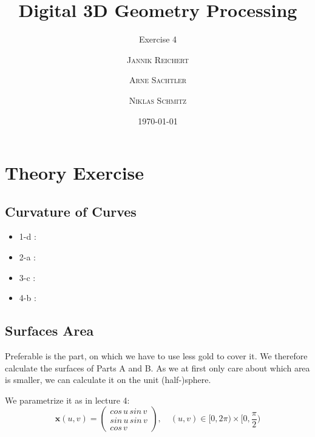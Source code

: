 \documentclass{scrartcl}
\title{Digital 3D Geometry Processing}
\subtitle{Exercise 4}
\author{\textsc{Jannik Reichert} \and \textsc{Arne Sachtler} \and \textsc{Niklas Schmitz}}
\date{\today}
\begin{document}
\maketitle

\section{Theory Exercise}

\subsection{Curvature of Curves}

\begin{itemize}
	\item 1-d : 
	\item 2-a : 
	\item 3-c : 
	\item 4-b : 
\end{itemize}

\subsection{Surfaces Area}

Preferable is the part, on which we have to use less gold to cover it.
We therefore calculate the surfaces of Parts A and B.
As we at first only care about which area is smaller, we can calculate it on the 
unit (half-)sphere.

We parametrize it as in lecture 4:
\begin{equation}
	\mathbf{x}(u,v) = 
	\begin{pmatrix}
		cos\,u\,sin\,v\\
		sin\,u\,sin\,v\\
		cos\,v
	\end{pmatrix}
	,\quad
	(u,v)\in[0,2\pi)\times [0,\frac{\pi}{2})
\end{equation}
\end{document}

